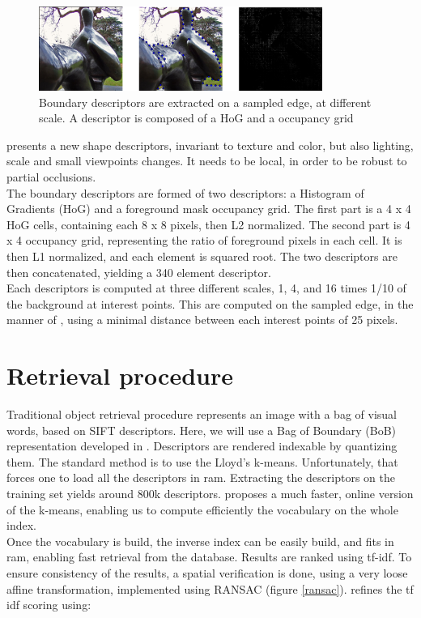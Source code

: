 \documentclass{article}
\begin{document}
\begin{figure}

\label{boundary-descriptors}
\begin{center}
\includegraphics[width=350px]{images/desc.png}
\end{center}
\caption{Boundary descriptors are extracted on a sampled edge, at different
scale. A descriptor is composed of a HoG and a occupancy grid}
\end{figure}


\cite{Arandjelovic11} presents a new shape descriptors, invariant to texture
and color, but also lighting, scale and small viewpoints changes. It needs to
be local, in order to be robust to partial occlusions. \\
The boundary descriptors are formed of two descriptors: a Histogram of
Gradients (HoG) and a foreground mask occupancy grid. The first part is a
4 x 4 HoG cells, containing each 8 x 8 pixels, then L2 normalized. The second
part is 4 x 4 occupancy grid, representing the ratio of foreground pixels in
each cell. It is then L1 normalized, and each element is squared root. The two
descriptors are then concatenated, yielding a 340 element descriptor. \\
Each descriptors is computed at three different scales, 1, 4, and 16 times
1/10 of the background at interest points. This are computed  on the sampled
edge, in the manner of \cite{BelongieMP02}, using a minimal distance between
each interest points of 25 pixels.

\section{Retrieval procedure}

Traditional object retrieval procedure represents an image with a bag of
visual words, based on SIFT descriptors. Here, we will use a Bag of Boundary
(BoB) representation developed in \cite{Arandjelovic11}. Descriptors are
rendered indexable by quantizing them. The standard method is to use the
Lloyd's k-means. Unfortunately, that forces one to load all the descriptors in
ram. Extracting the descriptors on the training set yields around 800k
descriptors. \cite{fast-k-means} proposes a much faster, online version of
the k-means, enabling us to compute efficiently the vocabulary on the whole
index. \\
Once the vocabulary is build, the inverse index can be easily build, and fits
in ram, enabling fast retrieval from the database. Results are ranked using
tf-idf. To ensure consistency of the results, a spatial verification is done,
using a very loose affine transformation, implemented using RANSAC (figure
\ref{ransac}). \cite{Arandjelovic11} refines the tf idf scoring using:
\end{document}
